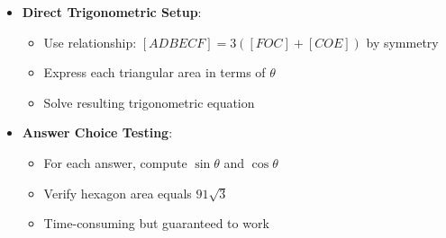 \documentclass[12pt]{article}
\begin{document}
\begin{techniquesbox}
\begin{itemize}[leftmargin=*]
    \item \textbf{Direct Trigonometric Setup}:
    \begin{itemize}
        \item Use relationship: $[ADBECF] = 3([FOC] + [COE])$ by symmetry
        \item Express each triangular area in terms of $\theta$
        \item Solve resulting trigonometric equation
    \end{itemize}
    
    \item \textbf{Answer Choice Testing}:
    \begin{itemize}
        \item For each answer, compute $\sin\theta$ and $\cos\theta$
        \item Verify hexagon area equals $91\sqrt{3}$
        \item Time-consuming but guaranteed to work
    \end{itemize}
\end{itemize}
\end{techniquesbox}
\end{document}
